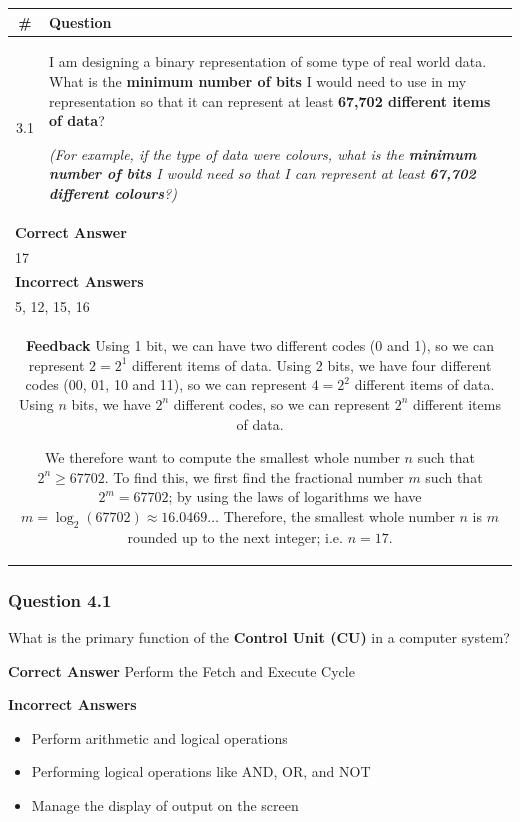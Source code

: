 \begin{tabularx}{\textwidth}{|c|X|}
\hline
\# & Question \\
\hline
3.1 & I am designing a binary representation of some type of real world data. What is the \textbf{minimum number of bits} I would need to use in my representation so that it can represent at least \textbf{67,702 different items of data}?

\textit{(For example, if the type of data were colours, what is the \textbf{minimum number of bits} I would need so that I can represent at least \textbf{67,702 different colours}?)}
\\
\hline
\multicolumn{2}{|l|}{\textbf{Correct Answer}} \\
\multicolumn{2}{|l|}{17} \\
\hline
\multicolumn{2}{|l|}{\textbf{Incorrect Answers}} \\
\multicolumn{2}{|l|}{5, 12, 15, 16} \\
\hline
\multicolumn{2}{|p{14cm}|}{
\textbf{Feedback} \newline
Using 1 bit, we can have two different codes (0 and 1), so we can represent $2 = 2^1$ different items of data. Using 2 bits, we have four different codes (00, 01, 10 and 11), so we can represent $4 = 2^2$ different items of data. Using $n$ bits, we have $2^n$ different codes, so we can represent $2^n$ different items of data.

We therefore want to compute the smallest whole number $n$ such that $2^n \geq 67702$. To find this, we first find the fractional number $m$ such that $2^m = 67702$; by using the laws of logarithms we have $m = \log_2(67702) \approx 16.0469\ldots$ Therefore, the smallest whole number $n$ is $m$ rounded up to the next integer; i.e. $n = 17$.
} \\
\hline
\end{tabularx}



\subsubsection{Question 4.1}

What is the primary function of the \textbf{Control Unit (CU)} in a computer system?

\textbf{Correct Answer}
Perform the Fetch and Execute Cycle

\textbf{Incorrect Answers}
\begin{itemize}
    \item Perform arithmetic and logical operations
    \item Performing logical operations like AND, OR, and NOT
    \item Manage the display of output on the screen
\end{itemize}

